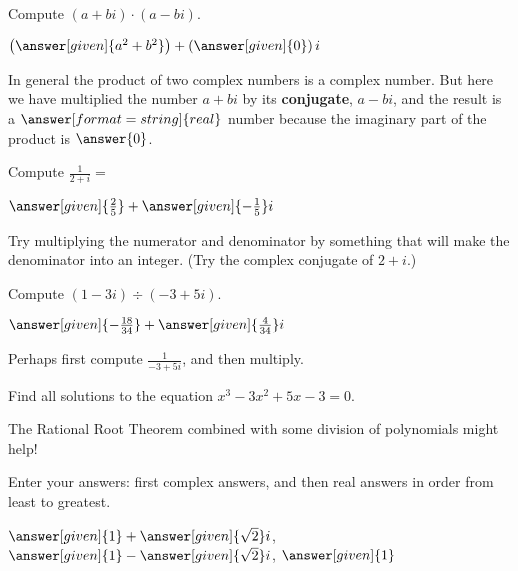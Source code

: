 \documentclass[nooutcomes]{ximera}
\begin{document}
\begin{problem}
Compute $(a+bi) \cdot (a-bi)$.
\begin{prompt}
	$\left(\answer[given]{a^2+b^2}\right) + \left(\answer[given]{0}\right)i$
\end{prompt}
\begin{problem}
In general the product of two complex numbers is a complex number.  But here we have multiplied the number $a+bi$ by its
\textbf{conjugate}, $a-bi$, and the result is a $\answer[format=string]{real}$ number because the imaginary part of the product is $\answer{0}$.   
\end{problem}
\end{problem}


\begin{problem}
Compute $\frac{1}{2+i} = $
\begin{prompt}
	$\answer[given]{\frac{2}{5}} + \answer[given]{-\frac{1}{5}}i$
\end{prompt}
\begin{hint}
Try multiplying the numerator and denominator by something that will make the denominator into an integer.  
(Try the complex conjugate of $2+i$.)
\end{hint}

\end{problem}



\begin{problem}
Compute $(1-3i) \div (-3+5i)$.
\begin{prompt}
	$\answer[given]{-\frac{18}{34}} + \answer[given]{\frac{4}{34}}i$
\end{prompt}
\begin{hint}
Perhaps first compute $\frac{1}{-3+5i}$, and then multiply.
\end{hint}
\end{problem}



\begin{problem}
Find all solutions to the equation $x^3-3x^2+5x-3=0$. 
\begin{hint} 
The Rational Root Theorem combined with some division of polynomials might help!
\end{hint}
Enter your answers: first complex answers, and then real answers in order from least to greatest.

\begin{prompt}
$\answer[given]{1} + \answer[given]{\sqrt{2}}i$, $\answer[given]{1} - \answer[given]{\sqrt{2}}i$, $\answer[given]{1}$
\end{prompt}
\end{problem}
\end{document}
